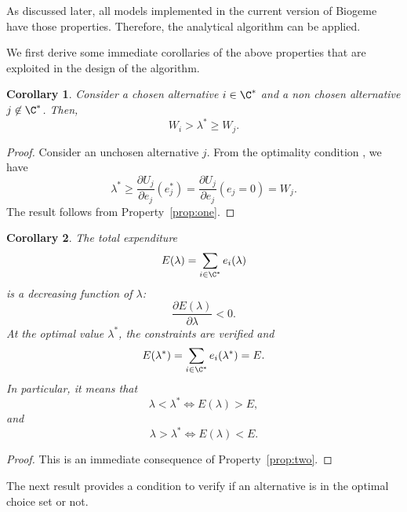\documentclass[12pt,a4paper]{article}
\newtheorem{corollary}{Corollary}
\begin{document}
As discussed later, all models implemented in the current version of Biogeme have those properties. Therefore, the
analytical algorithm can be applied.

We first derive some immediate corollaries of the above properties that are exploited in the design of the algorithm.

\begin{corollary}
    \label{cor:bounds_lambda}
    Consider a chosen alternative $i \in  \C^*$ and a non chosen alternative $j \not\in\C^*$. Then,
    \begin{equation}
        \label{eq:bounds_lambda}
        W_i > \lambda^* \geq W_j.
    \end{equation}
\end{corollary}
\begin{proof}
   Consider an unchosen alternative $j$. From the optimality condition , we have
    \[
        \lambda^* \geq \frac{\partial U_j}{\partial e_j}(e^*_j) = \frac{\partial U_j}{\partial e_j}(e_j=0) = W_j.
    \]
    The result follows from Property~\ref{prop:one}.
\end{proof}



\begin{corollary}
    \label{cor:total_consumption}
    The total expenditure
    \[
        E(\lambda) = \sum_{i\in \C^*} e_i(\lambda)
    \]
    is  a decreasing function of $\lambda$:
    \[
        \frac{\partial E(\lambda)}{\partial \lambda} < 0.
    \]
    At the optimal value  $\lambda^*$, the constraints are verified and
    \begin{equation}
        \label{eq:check_total_budget}
        E(\lambda^*) = \sum_{i\in \C^*} e_i(\lambda^*) = E.
    \end{equation}
    In particular, it means that
    \[
        \lambda < \lambda^* \iff E(\lambda) > E,
    \]
    and
    \[
        \lambda > \lambda^* \iff E(\lambda) < E.
    \]
\end{corollary}
\begin{proof} This is an immediate consequence of  Property~\ref{prop:two}.
\end{proof}


The next result provides a condition to verify if an alternative is in the optimal choice set or not.
\end{document}
